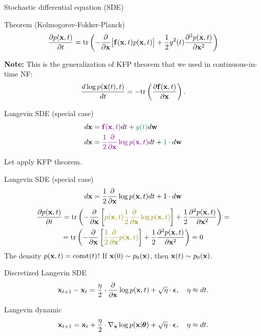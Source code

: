 \begin{frame}{Stochastic differential equation (SDE)}
 	\begin{block}{Theorem (Kolmogorov-Fokker-Planck)}
 		\vspace{-0.2cm}
 		\[
 			\frac{\partial p(\mathbf{x}, t)}{\partial t} = \text{tr}\left(- \frac{\partial}{\partial \mathbf{x}} \bigl[ \mathbf{f}(\mathbf{x}, t) p(\mathbf{x}, t)\bigr] + \frac{1}{2} g^2(t) \frac{\partial^2 p(\mathbf{x}, t)}{\partial \mathbf{x}^2} \right)
 		\]
 	\end{block}
 	 \textbf{Note:} This is the generalization of KFP theorem that we used in continuous-in-time NF:
	\[
		\frac{d \log p(\mathbf{x}(t), t)}{d t} = - \text{tr} \left( \frac{\partial \mathbf{f}(\mathbf{x}, t)}{\partial \mathbf{x}} \right).
	\]
 	\begin{block}{Langevin SDE (special case)}
 		\vspace{-0.6cm}
 		\begin{align*}
 			d\mathbf{x} &= {\color{violet}\mathbf{f}(\mathbf{x}, t)} dt + {\color{teal}g(t)} d \mathbf{w} \\
 			d \mathbf{x} &= {\color{violet}\frac{1}{2} \frac{\partial}{\partial \mathbf{x}} \log p(\mathbf{x}, t)} d t + {\color{teal} 1 } \cdot d \mathbf{w}
 		\end{align*}
 	\end{block}
 	Let apply KFP theorem.
\end{frame}
\begin{frame}{Langevin SDE (special case)}
	\[
		d \mathbf{x} = \frac{1}{2} \frac{\partial}{\partial \mathbf{x}} \log p(\mathbf{x}, t) d t + 1 \cdot d \mathbf{w}
	\]
	\begin{multline*}
		\frac{\partial p(\bx, t)}{\partial t} =  \text{tr} \left(- \frac{\partial}{\partial \bx}\left[ {\color{olive}p(\bx, t) \frac{1}{2} \frac{\partial}{\partial \bx} \log p(\bx, t)} \right]  + \frac{1}{2} \frac{\partial^2 p(\bx, t)}{\partial \bx^2} \right) = \\
		= \text{tr} \left(- \frac{\partial}{\partial \bx}\left[ {\color{olive}\frac{1}{2} \frac{\partial}{\partial \bx} p(\bx, t) } \right]  + \frac{1}{2} \frac{\partial^2 p(\bx, t)}{\partial \bx^2} \right) = 0
	\end{multline*}
	The density $p(\mathbf{x}, t) = \text{const}(t)$! If $\mathbf{x}(0) \sim p_0(\mathbf{x})$, then $\mathbf{x}(t) \sim p_0(\mathbf{x})$.
	\begin{block}{Discretized Langevin SDE}
		\vspace{-0.3cm}
		\[
			\mathbf{x}_{t + 1} - \mathbf{x}_t = \frac{\eta}{2} \cdot \frac{\partial}{\partial \mathbf{x}} \log p(\mathbf{x}, t) + \sqrt{\eta} \cdot \boldsymbol{\epsilon}, \quad \eta \approx dt.
		\]
		\vspace{-0.4cm}
	\end{block}
	\begin{block}{Langevin dynamic}
		\vspace{-0.3cm}
		\[
			\mathbf{x}_{t + 1} = \mathbf{x}_t + \frac{\eta}{2} \cdot \nabla_{\mathbf{x}} \log p(\mathbf{x} | \boldsymbol{\theta}) + \sqrt{\eta} \cdot \boldsymbol{\epsilon}, \quad \eta \approx dt.
		\]
		\vspace{-0.3cm}
	\end{block}
\end{frame}
